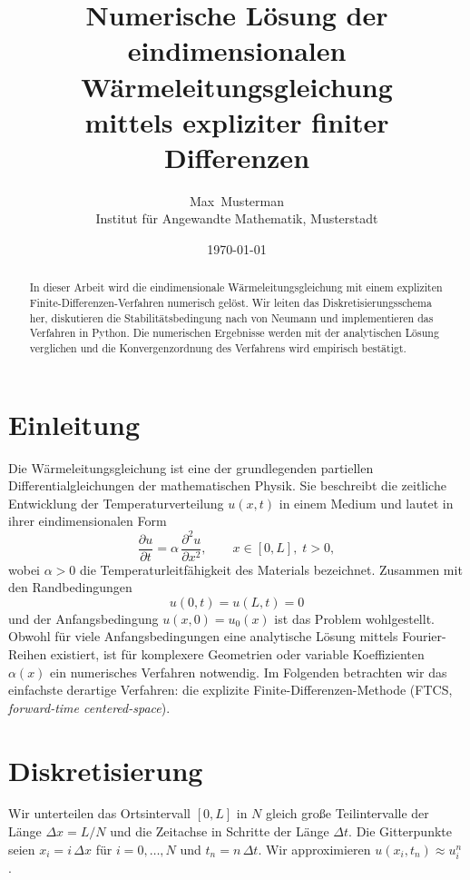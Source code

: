 \documentclass[11pt,a4paper]{article}
\title{Numerische Lösung der eindimensionalen Wärmeleitungsgleichung\\
mittels expliziter finiter Differenzen}
\author{Max\ Musterman \\ \small Institut für Angewandte Mathematik, Musterstadt}
\date{\today}
\begin{document}
\maketitle

\begin{abstract}
In dieser Arbeit wird die eindimensionale Wärmeleitungsgleichung mit einem expliziten
Finite-Differenzen-Verfahren numerisch gelöst. Wir leiten das Diskretisierungsschema her,
diskutieren die Stabilitätsbedingung nach von Neumann und implementieren das Verfahren
in Python. Die numerischen Ergebnisse werden mit der analytischen Lösung verglichen und
die Konvergenzordnung des Verfahrens wird empirisch bestätigt.
\end{abstract}

\section{Einleitung}
Die Wärmeleitungsgleichung ist eine der grundlegenden partiellen Differentialgleichungen
der mathematischen Physik. Sie beschreibt die zeitliche Entwicklung der Temperaturverteilung
$u(x,t)$ in einem Medium und lautet in ihrer eindimensionalen Form
\begin{equation}
\frac{\partial u}{\partial t} = \alpha \, \frac{\partial^2 u}{\partial x^2}, \qquad x \in [0, L], \; t > 0,
\label{eq:heat}
\end{equation}
wobei $\alpha > 0$ die Temperaturleitfähigkeit des Materials bezeichnet. Zusammen mit den
Randbedingungen
\begin{equation}
u(0,t) = u(L,t) = 0
\end{equation}
und der Anfangsbedingung $u(x,0) = u_0(x)$ ist das Problem wohlgestellt. Obwohl für viele
Anfangsbedingungen eine analytische Lösung mittels Fourier-Reihen existiert, ist für
komplexere Geometrien oder variable Koeffizienten $\alpha(x)$ ein numerisches Verfahren
notwendig. Im Folgenden betrachten wir das einfachste derartige Verfahren: die explizite
Finite-Differenzen-Methode (FTCS, \emph{forward-time centered-space}).

\section{Diskretisierung}
Wir unterteilen das Ortsintervall $[0, L]$ in $N$ gleich große Teilintervalle der Länge
$\Delta x = L / N$ und die Zeitachse in Schritte der Länge $\Delta t$. Die Gitterpunkte
seien $x_i = i \, \Delta x$ für $i = 0, \dots, N$ und $t_n = n \, \Delta t$. Wir approximieren
$u(x_i, t_n) \approx u_i^n$.
\end{document}
